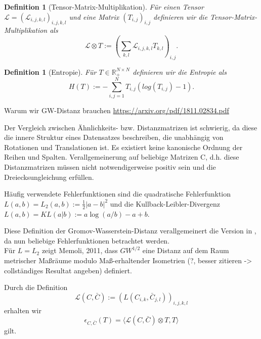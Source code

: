 \documentclass[11pt,a4paper]{article}
\newtheorem{definition}[theorem]{Definition}
\numberwithin{equation}{section}
\begin{document}
	\begin{definition}[Tensor-Matrix-Multiplikation]
		Für einen Tensor $\mathcal{L} = (\mathcal{L}_{i,j,k,l})_{i,j,k,l}$ und eine Matrix $(T_{i,j})_{i,j}$ definieren wir die Tensor-Matrix-Multiplikation als
		\begin{equation}
		\mathcal{L} \otimes T := \left(\sum_{k,l}{\mathcal{L}_{i,j,k,l}T_{k,l}}\right)_{i,j}. \label{eq:tensor_matrix_mul}
		\end{equation}
	\end{definition}
	
	\begin{definition}[Entropie]
		Für $T \in \mathbb{R}_{+}^{N \times N}$ definieren wir die Entropie als
		\begin{equation}
		H(T) := - \sum_{i,j=1}^N{T_{i,j}(log(T_{i,j})-1)}.
		\end{equation}
	\end{definition}
	
	Warum wir GW-Distanz brauchen
	\url{https://arxiv.org/pdf/1811.02834.pdf}
	
	Der Vergleich zwischen Ähnlichkeits- bzw. Distanzmatrizen ist schwierig, da diese die innere Struktur eines Datensatzes beschreiben, die unabhängig von Rotationen und Translationen ist. Es existiert keine kanonische Ordnung der Reihen und Spalten.
	Verallgemeinerung auf beliebige  Matrizen C, d.h. diese Distanzmatrizen müssen nicht notwendigerweise positiv sein und die Dreiecksungleichung erfüllen.
	

	
	\noindent Häufig verwendete Fehlerfunktionen sind die quadratische Fehlerfunktion $L(a,b) = L_2(a,b) := \frac{1}{2}|a-b|^2$ und die Kullback-Leibler-Divergenz $L(a,b)  = KL(a|b) := a\log(a/b) -a+b$.
	
	Diese Definition der Gromov-Wasserstein-Distanz verallgemeinert die Version in \cite{gwd_averaging_kernels}, da nun beliebige Fehlerfunktionen betrachtet werden.\\
	
	Für $L=L_2 $ zeigt Memoli, 2011, dass $GW^{1/2}$ eine Distanz auf dem Raum metrischer Maßräume modulo Maß-erhaltender Isometrien (?, besser zitieren -> collständiges Resultat angeben) definiert.

\cite{memoli2011gromov}
	Durch die Definition 
	\begin{equation}
	\mathcal{L} (C, \bar{C}):= (L(C_{i,k}, \bar{C}_{j,l}))_{i,j,k,l}
	\end{equation}
	erhalten wir
	\begin{equation}
	\mathcal{\epsilon}_{C, \bar{C}}(T) = \langle \mathcal{L} (C, \bar{C}) \otimes T, T\rangle
	\end{equation}
	gilt.
	
\end{document}
